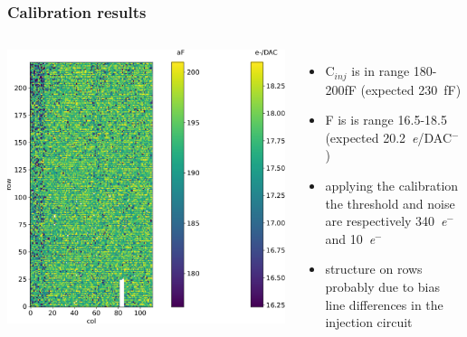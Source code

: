     \begin{frame}
        \frametitle{Calibration results}
        \begin{columns}
            \includegraphics[width=1.1\linewidth]{figures/charaterization/conversion_factor_map.pdf}
            \begin{itemize}
                \item C$_{inj}$ is in range 180-200\si{fF} (expected \SI{230}{fF})
                \item F is is range 16.5-18.5 (expected \SI{20.2}{\elementarycharge/DAC}$^-$)
                \item applying the calibration the threshold and noise are respectively \SI{340}{\elementarycharge}$^-$ and \SI{10}{\elementarycharge}$^-$
                \item structure on rows probably due to bias line differences in the injection circuit 
            \end{itemize}
        \end{columns}
    \end{frame}


